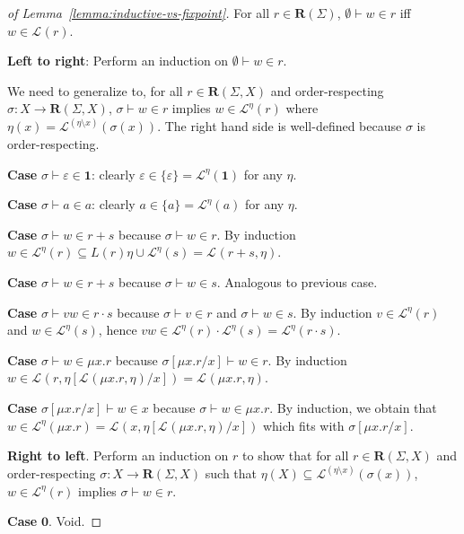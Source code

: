 \documentclass[runningheads, envcountsame, a4paper]{llncs}
\newcommand\Rnull{\mathbf0}
\newcommand\Rempty{\mathbf1}
\newcommand\Lang[1][{}]{\mathcal{L}^{#1}}
\renewcommand\L\Lang
\newcommand\Reg{\mathbf{R}}
\begin{document}
\clearpage{}
\begin{proof}[of Lemma~\ref{lemma:inductive-vs-fixpoint}]
    For all $r\in \Reg (\Sigma)$, $\emptyset \vdash w \in r$ iff $w
    \in \L (r)$.


    \textbf{Left to right}: Perform an induction on $\emptyset \vdash
    w \in r$.

    We need to generalize to, for all $r \in \Reg (\Sigma, X)$ and
    order-respecting $\sigma : X \to \Reg (\Sigma, X)$,
    $\sigma \vdash w \in r$ implies $w \in \L[{\eta}] (r)$ where $\eta (x)
    = \L[{ (\eta\setminus x)}] (\sigma (x))$. The right hand side is
    well-defined because $\sigma$ is order-respecting.

    \textbf{Case }$\sigma \vdash \varepsilon \in \Rempty$: clearly
    $\varepsilon \in \{\varepsilon\} = \L[{\eta}] (\Rempty)$ for any
    $\eta$.

    \textbf{Case }$\sigma \vdash a \in a$: clearly $a \in \{ a \} = \L[{\eta}]
    (a)$ for any $\eta$.

    \textbf{Case }$\sigma \vdash w \in r+s$ because $\sigma \vdash w
    \in r$. By induction $w \in \L[{ \eta}] (r) \subseteq L (r) \eta \cup
    \L[{\eta}] (s) = \L (r+s, { \eta })$.

    \textbf{Case }$\sigma \vdash w \in r+s$ because $\sigma \vdash w
    \in s$. Analogous to previous case.

    \textbf{Case }$\sigma \vdash vw \in r\cdot  s$ because $\sigma
    \vdash v \in r$ and $\sigma \vdash w \in s$. By induction $v \in
    \L[{\eta}] (r)$ and $w\in \L[{\eta}] (s)$, hence $vw \in \L[{\eta}] (r) \cdot
    \L[{\eta}] (s) = \L[{\eta}] (r \cdot s)$.

    \textbf{Case }$\sigma \vdash w \in \mu x.r$ because $\sigma[\mu
    x.r/x] \vdash  w \in r$. By induction $w \in \L (r, { \eta[\L (\mu
    x.r, \eta)/x]}) = \L (\mu x.r, {\eta})$. 

    \textbf{Case }$\sigma[\mu    x.r/x] \vdash w \in x$ because
    $\sigma \vdash w \in \mu x .r$. By induction, we obtain that $w
    \in \L[{ \eta}] (\mu x.r) = \L (x, {\eta[\L (\mu x.r, \eta)/x]})$ which
    fits with $\sigma[\mu x.r/x]$.

    \textbf{Right to left}. Perform an induction on $r$ to show that
    for all $r \in \Reg (\Sigma, X)$ and order-respecting $\sigma : X
    \to \Reg (\Sigma, X)$ such that $\eta (X) \subseteq \L[{ (\eta \setminus x)}] (\sigma
    (x))$, 
    $w \in \L[{ \eta}] (r)$ implies $\sigma \vdash w \in r$.

    \textbf{Case }$\Rnull$. Void.


\end{proof}
\end{document}
